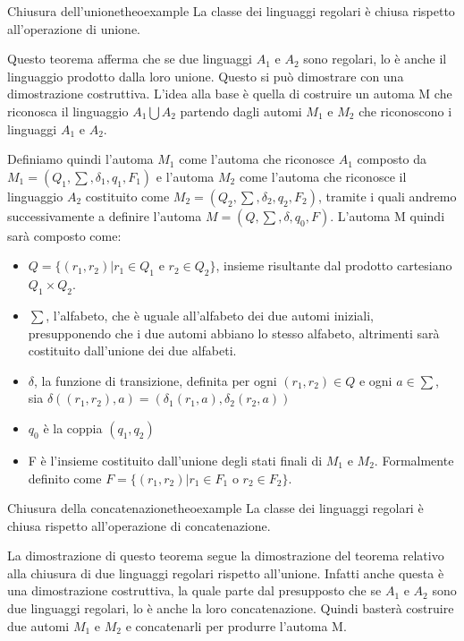 \documentclass[a4paper]{extarticle}
\begin{document}
\begin{teorema} {Chiusura dell'unione}{theoexample}
La classe dei linguaggi regolari è chiusa rispetto all'operazione di unione.
\end{teorema}
Questo teorema afferma che se due linguaggi $A_1$ e $A_2$ sono regolari, lo è anche il linguaggio prodotto dalla loro unione. Questo si può dimostrare con una dimostrazione costruttiva. L'idea alla base è quella di costruire un automa M che riconosca il linguaggio $A_1 \bigcup A_2$ partendo dagli automi $M_1$ e $M_2$ che riconoscono i linguaggi $A_1$ e $A_2$.

Definiamo quindi l'automa $M_1$ come l'automa che riconosce $A_1$ composto da $M_1= (Q_1,\sum,\delta_1,q_1,F_1)$  e l'automa $M_2$ come l'automa che riconosce il linguaggio $A_2$ costituito come $M_2 = (Q_2,\sum,\delta_2,q_2,F_2)$, tramite i quali andremo successivamente a definire l'automa $M=(Q,\sum,\delta,q_0,F)$.
L'automa M quindi sarà composto come:
\begin{itemize}
\item $Q=\{ (r_1,r_2)| r_1 \in Q_1$ e  $r_2 \in Q_2\}$, insieme risultante dal prodotto cartesiano $Q_1 \times Q_2$.
\item $\sum$, l'alfabeto, che è uguale all'alfabeto dei due automi iniziali, presupponendo che i due automi abbiano lo stesso alfabeto, altrimenti sarà costituito dall'unione dei due alfabeti.
\item $\delta$, la funzione di transizione, definita per ogni $(r_1,r_2) \in Q$ e ogni $a \in \sum$, sia $\delta((r_1,r_2),a)=(\delta_1(r_1,a),\delta_2(r_2,a))$
\item $q_0$ è la coppia $(q_1,q_2)$
\item F è l'insieme costituito dall'unione degli stati finali di $M_1$ e $M_2$. Formalmente definito come $F=\{(r_1,r_2)|r_1 \in F_1$ o $r_2 \in F_2\}$.
\end{itemize}

\begin{teorema} {Chiusura della concatenazione}{theoexample}
La classe dei linguaggi regolari è chiusa rispetto all'operazione di concatenazione.
\end{teorema}

La dimostrazione di questo teorema segue la dimostrazione del teorema relativo alla chiusura di due linguaggi regolari rispetto all'unione. Infatti anche questa è una dimostrazione costruttiva, la quale parte dal presupposto che se $A_1$ e $A_2$ sono due linguaggi regolari, lo è anche la loro concatenazione. Quindi basterà costruire due automi $M_1$ e $M_2$ e concatenarli per produrre l'automa M.
\end{document}
